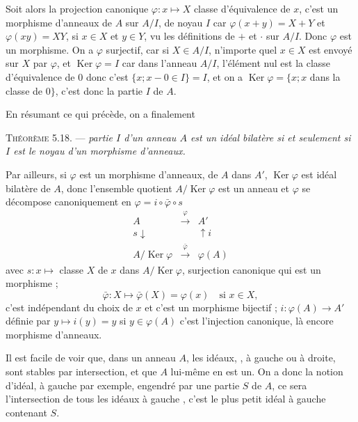 Soit alors la projection canonique $\varphi:x\mapsto X$ classe d'équivalence de $x$, c'est un morphisme d'anneaux de $A$ sur $A/I$, de noyau $I$ car $\varphi(x+y)=X+Y$ et $\varphi(xy)=XY$, si $x\in X$ et $y\in Y$, vu les définitions de $+$ et $\cdot$ sur $A/I$. Donc $\varphi$ est un morphisme. On a $\varphi$ surjectif, car si $X\in A/I$, n'importe quel $x\in X$ est envoyé sur $X$ par $\varphi$, et $\operatorname{Ker}\varphi=I$ car dans l'anneau $A/I$, l'élément nul est la classe d'équivalence de 0 donc c'est $\{x;x-0\in I\}=I$, et on a $\operatorname{Ker}\varphi=\{x;x$ dans la classe de $0\}$, c'est donc la partie $I$ de $A$.

En résumant ce qui précède, on a finalement

\medskip\noindent\textsc{Théorème 5.18.} --- \emph{ partie $I$ d'un anneau $A$ est un idéal bilatère si et seulement si $I$ est le noyau d'un morphisme d'anneaux.} \bookend

Par ailleurs, si $\varphi$ est un morphisme d'anneaux, de $A$ dans $A'$, $\operatorname{Ker}\varphi$ est idéal bilatère de $A$, donc l'ensemble quotient $A/\operatorname{Ker}\varphi$ est un anneau et $\varphi$ se décompose canoniquement en $\varphi=i\circ\bar\varphi\circ s$
\[
\begin{array}{ccccc}
A&\xrightarrow{\ \varphi\ }&A'\\
{\scriptstyle s}\downarrow&&\uparrow{\scriptstyle i}\\
A/\operatorname{Ker}\varphi&\xrightarrow{\ \bar\varphi\ }&\varphi(A)
\end{array}
\]
avec $s:x\mapsto$ classe $X$ de $x$ dans $A/\operatorname{Ker}\varphi$, surjection canonique qui est un morphisme ;
\[
\bar\varphi:X\mapsto\bar\varphi(X)=\varphi(x)\quad\text{si }x\in X,
\]
c'est indépendant du choix de $x$ et c'est un morphisme bijectif ; $i:\varphi(A)\longrightarrow A'$ définie par $y\mapsto i(y)=y$ si $y\in\varphi(A)$ c'est l'injection canonique, là encore morphisme d'anneaux.


Il est facile de voir que, dans un anneau $A$, les idéaux, , à gauche ou à droite, sont stables par intersection, et que $A$ lui-même en est un. On a donc la notion d'idéal, à gauche par exemple, engendré par une partie $S$ de $A$, ce sera l'intersection de tous les idéaux à gauche , c'est le plus petit idéal à gauche contenant $S$.

